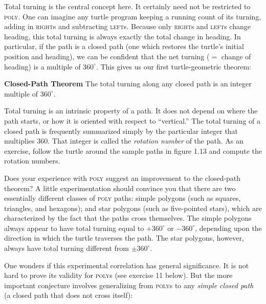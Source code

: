 \documentclass{book}
\begin{document}
Total turning is the central concept here. It certainly need not be
restricted to \textsc{poly}. One can imagine any turtle program keeping a
running count of its turning, adding in \textsc{right}s and subtracting \textsc{left}s.
Because only \textsc{right}s and \textsc{left}s change heading, this total turning is
always exactly the total change in heading. In particular, if the path is a
closed path (one which restores the turtle's initial position and heading),
we can be confident that the net turning ($=$ change of heading) is a
multiple of $360^{\circ}$. This gives us our first turtle-geometric theorem:

\vspace{0.5cm}

\noindent \textbf{Closed-Path Theorem} The total turning along any closed path is an
integer multiple of $360^{\circ}$.

\vspace{0.5cm}

Total turning is an intrinsic property of a path. It does not depend on
where the path starts, or how it is oriented with respect to ``vertical.''
The total turning of a closed path is frequently summarized simply by
the particular integer that multiplies 360. That integer is called the
{\em rotation number} of the path. As an exercise, follow the turtle around
the sample paths in figure 1.13 and compute the rotation numbers.

Does your experience with \textsc{poly} suggest an improvement to the closed-path 
theorem? A little experimentation should convince you that there
are two essentially different classes of \textsc{poly} paths: simple polygons (such
as squares, triangles, and hexagons); and star polygons (such as five-pointed stars), which are characterized by the fact that the paths cross
themselves. The simple polygons always appear to have total turning
equal to $+360^{\circ}$ or $-360^{\circ}$, depending upon the direction in which the
turtle traverses the path. The star polygons, however, always have total
turning different from $\pm 360^{\circ}$.

One wonders if this experimental correlation has general significance.
It is not hard to prove its validity for \textsc{poly}s (see exercise 11 below). But
the more important conjecture involves generalizing from \textsc{poly}s to any
{\em simple closed path} (a closed path that does not cross itself):

\vspace{0.5cm}
\end{document}
